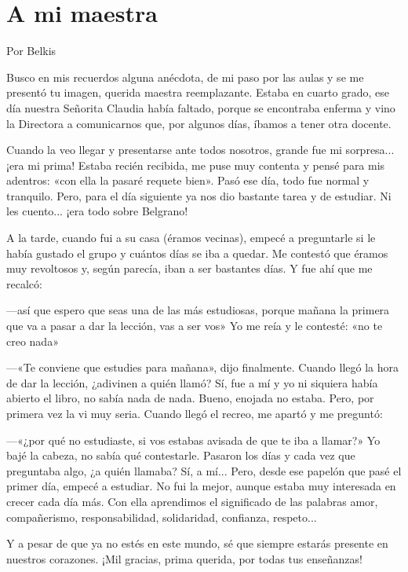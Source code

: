 \documentclass[11pt,twoside,openright,a5paper]{book}
\begin{document}
\section*{A mi maestra}

\begin{flushright}Por Belkis\end{flushright}

Busco en mis recuerdos alguna anécdota, de mi paso por las aulas y se me presentó tu imagen, querida maestra reemplazante. Estaba en cuarto grado, ese día nuestra Señorita Claudia había faltado, porque se encontraba enferma y vino la Directora a comunicarnos que, por algunos días, íbamos a tener otra docente.

Cuando la veo llegar y presentarse ante todos nosotros, grande fue mi sorpresa... ¡era mi prima! Estaba recién recibida, me puse muy contenta y pensé para mis adentros: «con ella la pasaré requete bien». Pasó ese día, todo fue normal y tranquilo. Pero, para el día siguiente ya nos dio bastante tarea y de estudiar. Ni les cuento... ¡era todo sobre Belgrano!

A la tarde, cuando fui a su casa (éramos vecinas), empecé a preguntarle si le había gustado el grupo y cuántos días se iba a quedar. Me contestó que éramos muy revoltosos y, según parecía,  iban a ser bastantes días. Y fue ahí que me recalcó: 

---así que espero que seas una de las más estudiosas, porque mañana la primera que va a pasar a dar la lección, vas a ser vos»
Yo me reía y le contesté: «no te creo nada»

---«Te conviene que estudies para mañana», dijo finalmente.
Cuando llegó la hora de dar la lección, ¿adivinen a quién llamó? Sí, fue a mí y yo ni siquiera había abierto el libro, no sabía nada de nada. Bueno, enojada no estaba. Pero, por primera vez la vi muy seria. Cuando llegó el recreo, me apartó y me preguntó: 

---«¿por qué no estudiaste, si vos estabas avisada de que te iba a llamar?» Yo bajé la cabeza, no sabía qué contestarle.
Pasaron los días y cada vez que preguntaba algo, ¿a quién llamaba? Sí, a mí...
Pero, desde ese papelón que pasé el primer día, empecé a estudiar. No fui la mejor, aunque estaba muy interesada en crecer cada día más. Con ella aprendimos el significado de las palabras amor, compañerismo, responsabilidad, solidaridad, confianza, respeto...

Y a pesar de que ya no estés en este mundo, sé que siempre estarás presente en nuestros corazones. ¡Mil gracias, prima querida, por todas tus enseñanzas!
\clearpage
\end{document}
